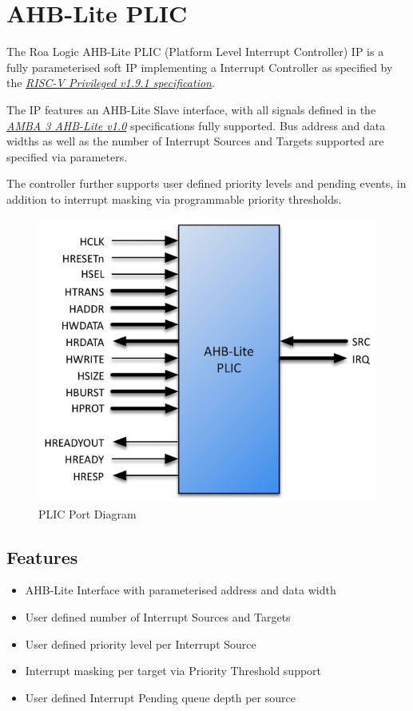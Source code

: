 \chapter{AHB-Lite PLIC}

The Roa Logic AHB-Lite PLIC (Platform Level Interrupt Controller) IP is a fully parameterised soft IP implementing a Interrupt Controller as specified by the \emph{\href{https://people.eecs.berkeley.edu/\%7Ekrste/papers/riscv-privileged-v1.9.1.pdf}{RISC-V Privileged v1.9.1 specification}}.

The IP features an AHB-Lite Slave interface, with all signals defined in the \emph{\href{https://www.arm.com/products/system-ip/amba-specifications}{AMBA 3 AHB-Lite v1.0}} specifications fully supported. Bus address and data widths as well as the number of Interrupt Sources and Targets supported are specified via parameters.

The controller further supports user defined priority levels and pending events, in addition to interrupt masking via programmable priority thresholds.

\begin{figure}[h]
  \includegraphics{../assets/graphics/AHB-Lite_PLIC_Port_Diagram.png}
  \caption{PLIC Port Diagram}
  \label{fig:PORTDIAG}
\end{figure}

\section{Features}

\begin{itemize}
\item
  AHB-Lite Interface with parameterised address and data width
\item
  User defined number of Interrupt Sources and Targets
\item
  User defined priority level per Interrupt Source
\item
  Interrupt masking per target via Priority Threshold support
\item
  User defined Interrupt Pending queue depth per source
\end{itemize}
